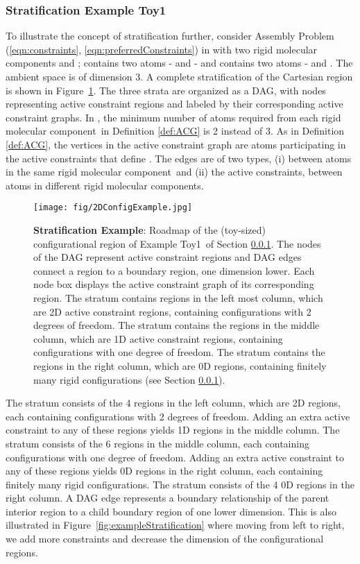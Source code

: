\documentclass[]{article}
\newcommand{\figref}[1]{Figure~\ref{#1}}
\newcommand{\rmc}{rigid molecular component}
\newcommand{\ctwo}{\ref{eqn:preferredConstraints}}
\newcommand{\cone}{\ref{eqn:constraints}}
\newcommand{\toytwodone}{Toy1}
\begin{document}
\subsubsection{Stratification Example \toytwodone}
\label{sec:toytwodone}
To illustrate the concept of stratification further, consider Assembly Problem
(\cone, \ctwo) in  with two \rmc s  and ;
 contains two atoms -  and  - and
 contains two atoms -  and . The ambient space is
 of dimension 3. A complete stratification of the Cartesian region is
shown in \figref{fig:2DToy}. The three strata are organized as a DAG, with
nodes representing active constraint regions and labeled by their corresponding
active constraint graphs. In , the minimum number
of atoms required from each \rmc\ in Definition \ref{def:ACG} is 2 instead of
3. As in Definition \ref{def:ACG}, the vertices in the active constraint graph
are atoms participating in the active constraints that define . The edges
are of two types, (i) between atoms in the same \rmc\ and (ii) the active
constraints, between atoms in different \rmc s.
\begin{figure}[htpb]
\centering
\texttt{[image: fig/2DConfigExample.jpg]}
\caption{\scriptsize \textbf{Stratification Example}: Roadmap of the (toy-sized) configurational
region of Example \toytwodone\ of Section \ref{sec:toytwodone}. 
The nodes of the DAG represent active constraint regions and DAG edges 
connect a region to a boundary region, one dimension lower. Each node 
box displays the active constraint graph of its corresponding region. 
The stratum  contains regions in the left most column, which are
2D active constraint regions, containing configurations with 2 degrees
of freedom. The stratum  contains the regions in the middle column, 
which are 1D active constraint regions, containing configurations with
one degree of freedom. 
The stratum  contains the regions in the right column, which
are 0D regions, containing finitely many rigid configurations
(see Section \ref{sec:toytwodone}). }
\label{fig:2DToy}
\end{figure}

The stratum  consists of the 4 regions in the left column, which are 2D
regions, each containing configurations with 2 degrees of freedom.  Adding an
extra active constraint to any of these regions yields 1D regions in the middle
column. The stratum  consists of the 6 regions in the middle column, each
containing configurations with one degree of freedom. Adding an extra active
constraint to any of these regions yields 0D regions in the right column, each
containing finitely many rigid configurations.  The stratum  consists of
the 4 0D regions in the right column.  A DAG edge represents a boundary
relationship of the parent interior region to a child boundary region of one
lower dimension. This is also illustrated in \figref{fig:exampleStratification}
where moving from left to right, we add more constraints and decrease the
dimension of the configurational regions.
\end{document}
